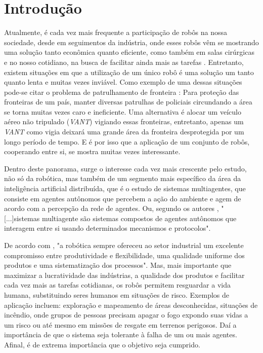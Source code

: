 %
%

\chapter{Introdução}\label{chap:introducao}
Atualmente, é cada vez mais frequente a participação de robôs na nossa sociedade, desde em seguimentos da indústria, onde esses robôs vêm se mostrando uma solução tanto econômica quanto eficiente, como também em salas cirúrgicas e no nosso cotidiano, na busca de facilitar ainda mais as tarefas \cite{HCWSNX02,CMHL08}. Entretanto, existem situações em que a utilização de um único robô é uma solução um tanto quanto lenta e muitas vezes inviável. Como exemplo de uma dessas situações pode-se citar o problema de patrulhamento de fronteira \cite{CMAJJBC08} : Para proteção das fronteiras de um país, manter diversas patrulhas de policiais circundando a área se torna muitas vezes caro e ineficiente. Uma alternativa é alocar um veículo aéreo não tripulado (\emph{VANT}) vigiando essas fronteiras, entretanto, apenas um \emph{VANT} como vigia deixará uma grande área da fronteira desprotegida por um longo período de tempo. E é por isso que a aplicação de um conjunto de robôs, cooperando entre si, se mostra muitas vezes interessante.  

Dentro deste panorama, surge o interesse cada vez mais crescente pelo estudo, não só da robótica, mas também de um segmento mais específico da área da inteligência artificial distribuída, que é o estudo de sistemas multiagentes, que consiste em agentes autônomos que percebem a ação do ambiente e agem de acordo com a percepção da rede de agentes. Ou, segundo os autores , "[...]sistemas multiagente são sistemas compostos de agentes autônomos que interagem entre si usando determinados mecanismos e protocolos". %

De acordo com \cite{SHA08} , "a robótica sempre ofereceu ao setor industrial um excelente compromisso entre produtividade e flexibilidade, uma qualidade uniforme dos produtos e uma sistematização dos processos". Mas, mais importante que maximizar a lucratividade das indústrias, a qualidade dos produtos e facilitar cada vez mais as tarefas cotidianas, os robôs permitem resguardar a vida humana, substituindo seres humanos em situações de risco. Exemplos de aplicação incluem: exploração e mapeamento de áreas desconhecidas, situações de incêndio, onde grupos de pessoas precisam apagar o fogo expondo suas vidas a um risco ou até mesmo em missões de resgate em terrenos perigosos. Daí a importância de que o sistema seja tolerante à falha de um ou mais agentes. Afinal, é de extrema importância que o objetivo seja cumprido.

